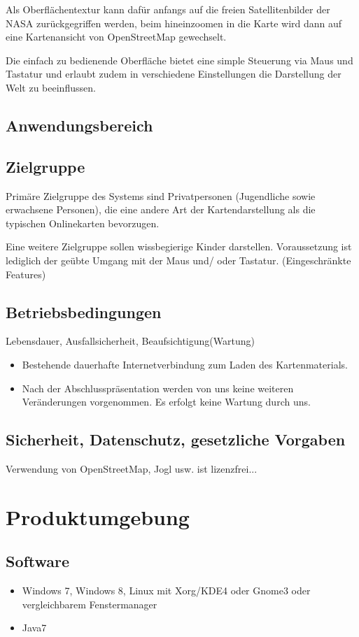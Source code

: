 \documentclass[10pt]{report}
\begin{document}
Als Oberﬂächentextur kann dafür anfangs auf die freien Satellitenbilder der
NASA zurückgegriﬀen werden, beim hineinzoomen in die Karte wird dann auf eine Kartenansicht von OpenStreetMap gewechselt.

Die einfach zu bedienende Oberﬂäche bietet eine simple Steuerung via Maus und Tastatur und erlaubt zudem in verschiedene Einstellungen die Darstellung der Welt zu beeinﬂussen. 


\section{Anwendungsbereich}



\section{Zielgruppe}
Primäre Zielgruppe des Systems sind Privatpersonen (Jugendliche sowie erwachsene Personen), die eine andere Art der Kartendarstellung als die typischen Onlinekarten bevorzugen.

Eine weitere Zielgruppe sollen wissbegierige Kinder darstellen. Voraussetzung ist lediglich der geübte Umgang mit der Maus und/ oder Tastatur. (Eingeschränkte Features)

\section{Betriebsbedingungen}
Lebensdauer, Ausfallsicherheit, Beaufsichtigung(Wartung)

\begin{itemize}
\item Bestehende dauerhafte Internetverbindung zum Laden des Kartenmaterials.
\item Nach  der  Abschlusspräsentation  werden  von  uns  keine  weiteren 
Veränderungen vorgenommen. Es erfolgt keine Wartung durch uns.
\end{itemize} 

\section{Sicherheit, Datenschutz, gesetzliche Vorgaben}
Verwendung von OpenStreetMap, Jogl usw. ist lizenzfrei...


\chapter{Produktumgebung}
\section{Software}
\begin{itemize}
\item Windows 7, Windows 8, Linux mit Xorg/KDE4 oder Gnome3 oder vergleichbarem Fenstermanager
\item Java7 
\end{itemize}
\end{document}
